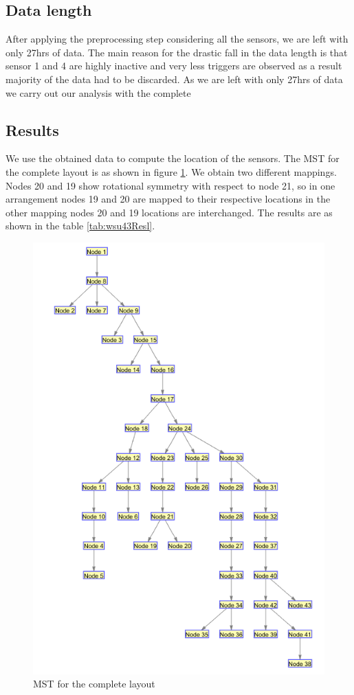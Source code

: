 \subsection{Data length}
After applying the preprocessing step considering all the sensors, we are left with only 27hrs of data. The main reason for the drastic fall in the data length is that sensor  1 and 4 are highly inactive and very less triggers are observed as a result majority of the data had to be discarded. As we are left with only 27hrs of data we carry out our analysis with the complete


\subsection{Results}

 We use the obtained data to compute the location of the sensors. The MST for the complete layout is as shown in figure \ref{fig:MST43}. We obtain two different mappings. 
 Nodes 20 and 19 show rotational symmetry with respect to node 21, so in one arrangement nodes 19 and 20 are mapped to their respective locations in the other mapping nodes 20 and 19 locations are interchanged. 
 The results are as shown in the table \ref{tab:wsu43Resl}.
  
  

\begin{figure}
\centering
\includegraphics{./pics/43_sensors.png}
\caption{MST for the complete layout}
\label{fig:MST43}
\end{figure}
 
